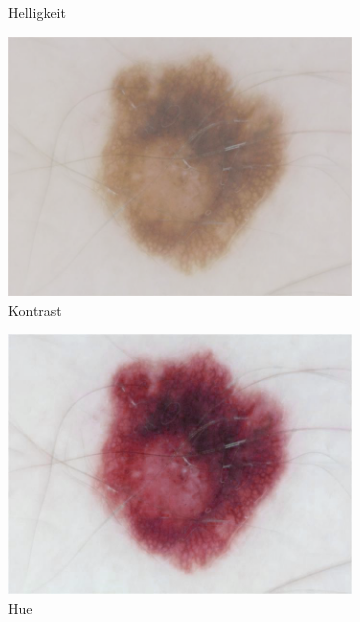 \begin{figure}[t!]
\begin{subfigure}{0.24\linewidth}
		\caption{Helligkeit}
		\label{subfig:aug_bright}
	\end{subfigure}
	\begin{subfigure}{0.24\linewidth}
		\includegraphics[width=\textwidth]{./pics/augmentations/contrast.png}
		\caption{Kontrast}
		\label{subfig:aug_contrast}
	\end{subfigure}
	\begin{subfigure}{0.24\linewidth}
		\includegraphics[width=\textwidth]{./pics/augmentations/hue.png}
		\caption{Hue}
		\label{subfig:aug_hue}
	\end{subfigure}
	\begin{subfigure}{0.24\linewidth}

\end{subfigure}
\end{figure}
